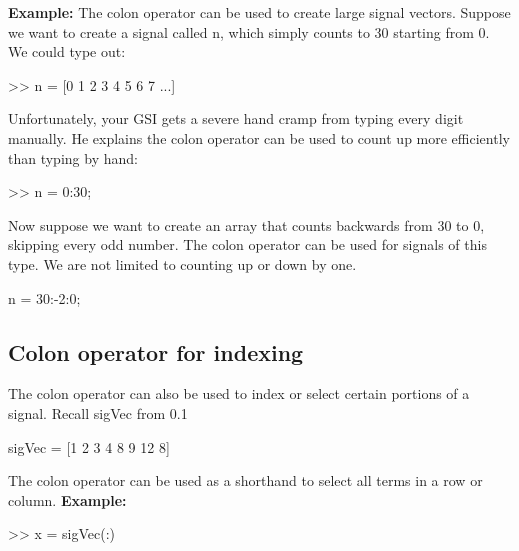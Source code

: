 \documentclass[11pt]{article}
\begin{document}
\vspace{4mm}
\textbf{Example:} The colon operator can be used to create large signal vectors. Suppose we want to create a signal called n, which simply counts to 30 starting from 0. We could type out:

\begin{center}
>> n = [0 1 2 3 4 5 6 7 ...]
\end{center}

\vspace{4mm}

Unfortunately, your GSI gets a severe hand cramp from typing every digit manually. He explains the colon operator can be used to count up more efficiently than typing by hand:

\begin{center}

>> n = 0:30;

\end{center}

\vspace{4mm}

Now suppose we want to create an array that counts backwards from 30 to 0, skipping every odd number. The colon operator can be used for signals of this type. We are not limited to counting up or down by one.

\begin{center}

n = 30:-2:0;

\end{center}

\subsection{Colon operator for indexing}
The colon operator can also be used to index or select certain portions of a signal. Recall sigVec from 0.1

\begin{center}
sigVec = [1 2 3 4 8 9 12 8]
\end{center} 

The colon operator can be used as a shorthand to select all terms in a row or column.\newline
\textbf{Example:} 

\begin{center}

>> x = sigVec(:)



\end{center}
\end{document}
